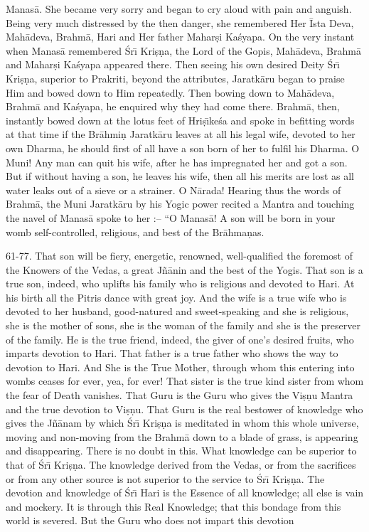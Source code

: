 Manas\=a. She became very sorry and began to cry aloud with pain and anguish. Being very much distressed by the then danger, she remembered Her \=Ista Deva, Mah\=adeva, Brahm\=a, Hari and Her father Mahar\d{s}i Ka\'syapa. On the very instant when Manas\=a remembered \'Sr\={\i} Kri\d{s}\d{n}a, the Lord of the Gopis, Mah\=adeva, Brahm\=a and Mahar\d{s}i Ka\'syapa appeared there. Then seeing his own desired Deity \'Sr\={\i} Kri\d{s}\d{n}a, superior to Prakriti, beyond the attributes, Jaratk\=aru began to praise Him and bowed down to Him repeatedly. Then bowing down to Mah\=adeva, Brahm\=a and Ka\'syapa, he enquired why they had come there. Brahm\=a, then, instantly bowed down at the lotus feet of Hri\d{s}\={\i}ke\'sa and spoke in befitting words at that time if the Br\=ahmi\d{n} Jaratk\=aru leaves at all his legal wife, devoted to her own Dharma, he should first of all have a son born of her to fulfil his Dharma. O Muni! Any man can quit his wife, after he has impregnated her and got a son. But if without having a son, he leaves his wife, then all his merits are lost as all water leaks out of a sieve or a strainer. O N\=arada! Hearing thus the words of Brahm\=a, the Muni Jaratk\=aru by his Yogic power recited a Mantra and touching the navel of Manas\=a spoke to her :-- ``O Manas\=a! A son will be born in your womb self-controlled, religious, and best of the Br\=ahma\d{n}as.

61-77. That son will be fiery, energetic, renowned, well-qualified the foremost of the Knowers of the Vedas, a great J\~n\=anin and the best of the Yogis. That son is a true son, indeed, who uplifts his family who is religious and devoted to Hari. At his birth all the Pitris dance with great joy. And the wife is a true wife who is devoted to her husband, good-natured and sweet-speaking and she is religious, she is the mother of sons, she is the woman of the family and she is the preserver of the family. He is the true friend, indeed, the giver of one's desired fruits, who imparts devotion to Hari. That father is a true father who shows the way to devotion to Hari. And She is the True Mother, through whom this entering into wombs ceases for ever, yea, for ever! That sister is the true kind sister from whom the fear of Death vanishes. That Guru is the Guru who gives the Vi\d{s}\d{n}u Mantra and the true devotion to Vi\d{s}\d{n}u. That Guru is the real bestower of knowledge who gives the J\~n\=anam by which \'Sr\={\i} Kri\d{s}\d{n}a is meditated in whom this whole universe, moving and non-moving from the Brahm\=a down to a blade of grass, is appearing and disappearing. There is no doubt in this. What knowledge can be superior to that of \'Sr\={\i} Kri\d{s}\d{n}a. The knowledge derived from the Vedas, or from the sacrifices or from any other source is not superior to the service to \'Sr\={\i} Kri\d{s}\d{n}a. The devotion and knowledge of \'Sr\={\i} Hari is the Essence of all knowledge; all else is vain and mockery. It is through this Real Knowledge; that this bondage from this world is severed. But the Guru who does not impart this devotion

